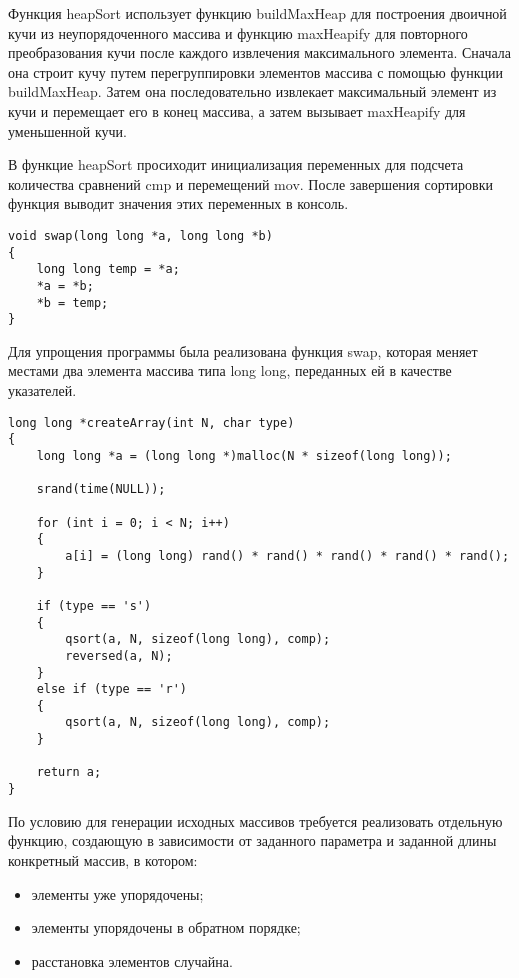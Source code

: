 \documentclass[a4paper,12pt,titlepage,finall]{article}
\begin{document}
Функция heapSort использует функцию buildMaxHeap для построения двоичной кучи из неупорядоченного массива и функцию maxHeapify для повторного преобразования кучи после каждого извлечения максимального элемента. Сначала она строит кучу путем перегруппировки элементов массива с помощью функции buildMaxHeap. Затем она последовательно извлекает максимальный элемент из кучи и перемещает его в конец массива, а затем вызывает maxHeapify для уменьшенной кучи.\par

В функцие heapSort просиходит инициализация переменных для подсчета количества сравнений cmp и перемещений mov. После завершения сортировки функция выводит значения этих переменных в консоль.\par

\lstset{language=c}
\begin{lstlisting}
void swap(long long *a, long long *b)
{
    long long temp = *a;
    *a = *b;
    *b = temp;
}
\end{lstlisting}

Для упрощения программы была реализована функция swap, которая меняет местами два элемента массива типа long long, переданных ей в качестве указателей.\par

\lstset{language=c}
\begin{lstlisting}
long long *createArray(int N, char type)
{
    long long *a = (long long *)malloc(N * sizeof(long long));

    srand(time(NULL));

    for (int i = 0; i < N; i++)
    {
        a[i] = (long long) rand() * rand() * rand() * rand() * rand();
    }
    
    if (type == 's')
    {
        qsort(a, N, sizeof(long long), comp);
        reversed(a, N);
    }
    else if (type == 'r')
    {
        qsort(a, N, sizeof(long long), comp);
    }

    return a;
}
\end{lstlisting} \par

По условию для генерации исходных массивов требуется реализовать отдельную функцию, создающую в зависимости от
заданного параметра и заданной длины конкретный массив, в котором:
\begin{itemize}
  \item элементы уже упорядочены;
  \item элементы упорядочены в обратном порядке;
  \item расстановка элементов случайна.
\end{itemize} \par
\end{document}
